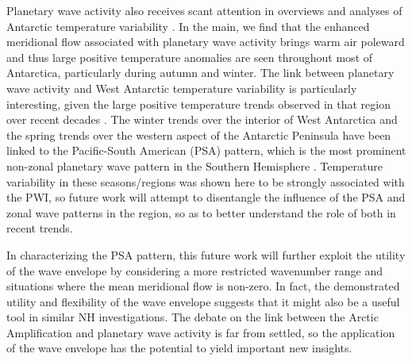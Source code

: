 Planetary wave activity also receives scant attention in overviews and analyses of Antarctic temperature variability \citep[e.g.][]{Russell2010,SchneiderOkumura2012,Yu2012}. In the main, we find that the enhanced meridional flow associated with planetary wave activity brings warm air poleward and thus large positive temperature anomalies are seen throughout most of Antarctica, particularly during autumn and winter. The link between planetary wave activity and West Antarctic temperature variability is particularly interesting, given the large positive temperature trends observed in that region over recent decades \citep[e.g.][]{Bromwich2013}. The winter trends over the interior of West Antarctica \citep{Ding2011} and the spring trends over the western aspect of the Antarctic Peninsula \citep{Ding2013} have been linked to the Pacific-South American (PSA) pattern, which is the most prominent non-zonal planetary wave pattern in the Southern Hemisphere \citep[e.g.][]{Mo2001}. Temperature variability in these seasons/regions was shown here to be strongly associated with the PWI, so future work will attempt to disentangle the influence of the PSA and zonal wave patterns in the region, so as to better understand the role of both in recent trends.    

In characterizing the PSA pattern, this future work will further exploit the utility of the wave envelope by considering a more restricted wavenumber range and situations where the mean meridional flow is non-zero. In fact, the demonstrated utility and flexibility of the wave envelope suggests that it might also be a useful tool in similar NH investigations. The debate on the link between the Arctic Amplification and planetary wave activity is far from settled, so the application of the wave envelope has the potential to yield important new insights.    
